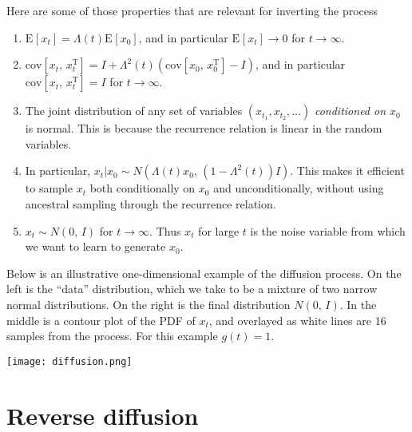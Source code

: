 \documentclass[10pt,letterpaper]{article}
\newcommand{\cov}[2]{\mathrm{cov}\!\left[#1,\,#2\right]}
\newcommand{\transp}{\mathrm{T}}
\newcommand{\normal}[2]{N\!\left(#1,\,#2\right)}
\newcommand{\expectation}[2]{\mathrm{E}_{#1}\!\left[#2\right]}
\begin{document}
Here are some of those properties that are relevant for inverting the process
\begin{enumerate}
    \item $\expectation{}{x_t} = \Lambda(t) \expectation{}{x_0}$, and in particular
        $\expectation{}{x_t}\to 0$ for $t \to \infty$.
    \item $\cov{x_t}{x_t^{\transp}} = I + \Lambda^2(t) (\cov{x_0}{x_0^\transp} - I)$, 
        and in particular $\cov{x_t}{x_t^{\transp}} = I$ for $t \to \infty$.
    \item The joint distribution of any set of variables $(x_{t_1}, x_{t_2},
        \ldots)$ \emph{conditioned on  $x_0$} is normal. This is because the
        recurrence relation is linear in the random variables.
    \item In particular, $x_t|x_0 \sim \normal{\Lambda(t) x_0}{(1 -
        \Lambda^2(t)) I}$. This makes it efficient to sample $x_t$ both
        conditionally on $x_0$ and unconditionally, without using ancestral
        sampling through the recurrence relation.
    \item $x_t \sim \normal{0}{I}$ for $t \to \infty$. Thus $x_t$ for large $t$
        is the noise variable from which we want to learn to generate $x_0$.
\end{enumerate}

Below is an illustrative one-dimensional example of the diffusion process. On
the left is the ``data'' distribution, which we take to be a mixture of two
narrow normal distributions. On the right is the final distribution
$\normal{0}{I}$. In the middle is a contour plot of the PDF of $x_t$, and
overlayed as white lines are 16 samples from the process. For this example
$g(t) = 1$.

\begin{center}
    \texttt{[image: diffusion.png]}
\end{center}

\section{Reverse diffusion}
\end{document}
